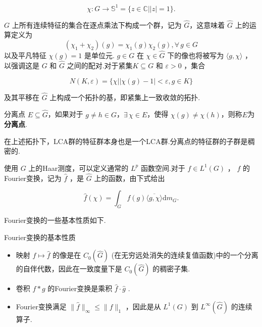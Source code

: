 \documentclass[lang=cn,a4paper,11pt,openany,scheme=chinese]{elegantbook}
\makeatletter
\newcommand{\wideline}{\setlength{\lineskip}{\baselineskip-\ccwd}\setlength{\lineskiplimit}{2.5pt}}
\renewcommand{\leq}{\leqslant}
\newcommand\setboxcounter[2]{\setcounter{tcb@cnt@#1}{#2}}
\makeatother
\begin{document}
\[
\chi  : G \rightarrow  {\mathbb{S}}^{1} = \{ z \in  \mathbb{C}\left| \right| z \mid   = 1\} .
\]

\(G\) 上所有连续特征的集合在逐点乘法下构成一个群，记为 \(\widehat{G}\)，这意味着 \(\widehat{G}\) 上的运算定义为
\[\left( {{\chi }_{1} + {\chi }_{2}}\right) \left( g\right)  = {\chi }_{1}\left( g\right) {\chi }_{2}\left( g\right),\forall\, g \in  G\]
以及平凡特征 \(\chi \left( g\right) = 1\) 是单位元. \(g \in  G\) 在 \(\chi  \in  \widehat{G}\) 下的像也将被写为 \(\langle g,\chi \rangle\) ，以强调这是 \(G\) 和 \(\widehat{G}\) 之间的配对.对于紧集\(K \subseteq  G\) 和 \(\varepsilon  > 0\) ，集合

\[
N\left( {K,\varepsilon }\right)  = \{ \chi \left| \right| \chi \left( g\right)  - 1 \mid   < \varepsilon, g \in  K\}
\]

及其平移在 \(\widehat{G}\) 上构成一个拓扑的基，即紧集上一致收敛的拓扑.
\begin{definition}{分离点}
    \(E \subseteq  \widehat{G}\)，如果对于 \(g \neq  h\in G\)，$\exists\,\chi  \in  E$，使得 \(\chi \left( g\right)  \neq  \chi \left( h\right)\)，则称$E$为\textbf{分离点}.
\end{definition}
\setboxcounter{theorem}{5}
\begin{theorem}{}
    在上述拓扑下，LCA群的特征群本身也是一个LCA群.分离点的特征群的子群是稠密的.
\end{theorem}

使用 \(G\) 上的Haar测度，可以定义通常的 \({L}^{p}\) 函数空间.对于 \(f \in  {L}^{1}\left( G\right)\) ， \(f\) 的Fourier变换，记为 \(\widehat{f}\) ，是 \(\widehat{G}\) 上的函数，由下式给出

\[
\widehat{f}\left( \chi \right)  = {\int }_{G}f\left( g\right) \overline{\langle g,\chi \rangle }\mathrm{d}{m}_{G}.
\]

Fourier变换的一些基本性质如下.
\begin{proposition}{Fourier变换的基本性质}
    \wideline
    \begin{itemize}
\item 映射 \(f \mapsto  \widehat{f}\) 的像是在 \({C}_{0}\left( \widehat{G}\right)\) (在无穷远处消失的连续复值函数)中的一个分离的自伴代数，因此在一致度量下是 \({C}_{0}\left( \widehat{G}\right)\) 的稠密子集.
\item 卷积 \(f * g\) 的Fourier变换是乘积 \(\widehat{f} \cdot  \widehat{g}\) .
\item Fourier变换满足 \(\parallel \widehat{f}{\parallel }_{\infty } \leq  \parallel f{\parallel }_{1}\) ，因此是从 \({L}^{1}\left( G\right)\) 到 \({L}^{\infty }\left( \widehat{G}\right)\) 的连续算子.
\end{itemize}
\end{proposition}
\end{document}
